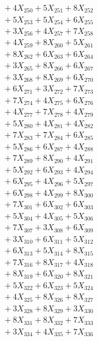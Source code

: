 \documentclass[a4paper,10pt]{article}
\begin{document}
{\begin{align}
&\;  + 4 X_{250} + 5 X_{251} + 8 X_{252} \\[0.3ex]
&\;  + 5 X_{253} + 5 X_{254} + 6 X_{255} \\[0.3ex]
&\;  + 3 X_{256} + 4 X_{257} + 7 X_{258} \\[0.3ex]
&\;  + 4 X_{259} + 8 X_{260} + 5 X_{261} \\[0.3ex]
&\;  + 8 X_{262} + 6 X_{263} + 6 X_{264} \\[0.3ex]
&\;  + 3 X_{265} + 8 X_{266} + 6 X_{267} \\[0.3ex]
&\;  + 3 X_{268} + 8 X_{269} + 6 X_{270} \\[0.3ex]
&\;  + 6 X_{271} + 3 X_{272} + 7 X_{273} \\[0.3ex]
&\;  + 7 X_{274} + 4 X_{275} + 6 X_{276} \\[0.3ex]
&\;  + 4 X_{277} + 7 X_{278} + 4 X_{279} \\[0.5ex]\allowbreak
&\;  + 5 X_{280} + 4 X_{281} + 4 X_{282} \\[0.3ex]
&\;  + 7 X_{283} + 7 X_{284} + 6 X_{285} \\[0.3ex]
&\;  + 5 X_{286} + 6 X_{287} + 4 X_{288} \\[0.3ex]
&\;  + 7 X_{289} + 8 X_{290} + 4 X_{291} \\[0.3ex]
&\;  + 5 X_{292} + 6 X_{293} + 4 X_{294} \\[0.3ex]
&\;  + 6 X_{295} + 4 X_{296} + 5 X_{297} \\[0.3ex]
&\;  + 6 X_{298} + 4 X_{299} + 8 X_{300} \\[0.3ex]
&\;  + 7 X_{301} + 6 X_{302} + 6 X_{303} \\[0.3ex]
&\;  + 5 X_{304} + 4 X_{305} + 5 X_{306} \\[0.3ex]
&\;  + 7 X_{307} + 3 X_{308} + 6 X_{309} \\[0.5ex]\allowbreak
&\;  + 3 X_{310} + 6 X_{311} + 5 X_{312} \\[0.3ex]
&\;  + 6 X_{313} + 5 X_{314} + 8 X_{315} \\[0.3ex]
&\;  + 7 X_{316} + 8 X_{317} + 4 X_{318} \\[0.3ex]
&\;  + 8 X_{319} + 6 X_{320} + 8 X_{321} \\[0.3ex]
&\;  + 5 X_{322} + 6 X_{323} + 5 X_{324} \\[0.3ex]
&\;  + 4 X_{325} + 8 X_{326} + 8 X_{327} \\[0.3ex]
&\;  + 3 X_{328} + 8 X_{329} + 3 X_{330} \\[0.3ex]
&\;  + 8 X_{331} + 8 X_{332} + 7 X_{333} \\[0.3ex]
&\;  + 3 X_{334} + 4 X_{335} + 7 X_{336} \\[0.3ex]

\end{align}}
\end{document}

